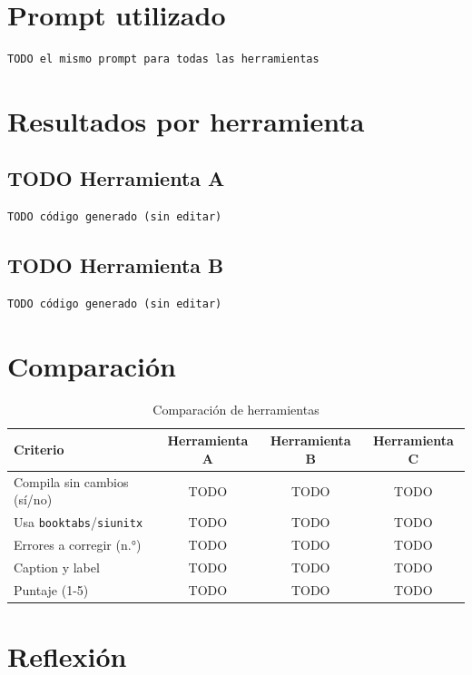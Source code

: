 \documentclass[12pt,a4paper]{article}
\begin{document}
\section{Prompt utilizado}
\begin{Verbatim}[frame=single,fontsize=\small]
TODO el mismo prompt para todas las herramientas
\end{Verbatim}

\section{Resultados por herramienta}
\subsection{TODO Herramienta A}
\begin{Verbatim}[frame=single,fontsize=\small]
TODO código generado (sin editar)
\end{Verbatim}
\subsection{TODO Herramienta B}
\begin{Verbatim}[frame=single,fontsize=\small]
TODO código generado (sin editar)
\end{Verbatim}

\section{Comparación}
\begin{table}[htbp]
  \centering
  \caption{Comparación de herramientas}
  \label{tab:comparacion}
  \begin{tabular}{lccc}
    \toprule
    Criterio & Herramienta A & Herramienta B & Herramienta C \\
    \midrule
    Compila sin cambios (sí/no) & TODO & TODO & TODO \\
    Usa \texttt{booktabs}/\texttt{siunitx} & TODO & TODO & TODO \\
    Errores a corregir (n.°) & TODO & TODO & TODO \\
    Caption y label & TODO & TODO & TODO \\
    Puntaje (1-5) & TODO & TODO & TODO \\
    \bottomrule
  \end{tabular}
\end{table}

\section{Reflexión}
\end{document}
